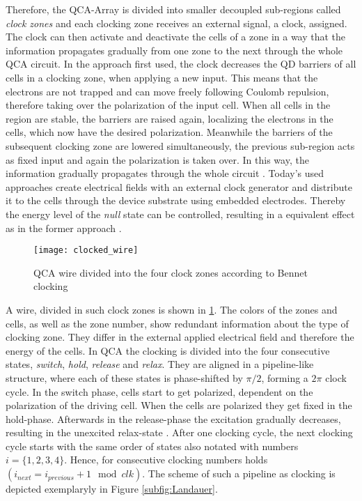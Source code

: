 Therefore, the QCA-Array is divided into smaller decoupled sub-regions called \textit{clock zones} and each clocking zone receives an external signal, a clock, assigned. The clock can then activate and deactivate the cells of a zone in a way that the information propagates gradually from one zone to the next through the whole QCA circuit. In the approach first used, the clock decreases the QD barriers of all cells in a clocking zone, when applying a new input. This means that the electrons are not trapped and can move freely following Coulomb repulsion, therefore taking over the polarization of the input cell. When all cells in the region are stable, the barriers are raised again, localizing the electrons in the cells, which now have the desired polarization. Meanwhile the barriers of the subsequent clocking zone are lowered simultaneously, the previous sub-region acts as fixed input and again the polarization is taken over. In this way, the information gradually propagates through the whole circuit \cite{lent1997device}. Today's used approaches create electrical fields with an external clock generator and distribute it to the cells through the device substrate using embedded electrodes. Thereby the energy level of the \textit{null} state can be controlled, resulting in a equivalent effect as in the former approach \cite{Walter}.\\
\begin{figure}
	\centering
	\texttt{[image: clocked\_wire]}
	\caption{QCA wire divided into the four clock zones according to Bennet clocking}\label{fig:QCA_wire_clocked}
\end{figure}
A wire, divided in such clock zones is shown in \ref{fig:QCA_wire_clocked}. The colors of the zones and cells, as well as the zone number, show redundant information about the type of clocking zone. They differ in the external applied electrical field and therefore the energy of the cells. In QCA the clocking is divided into the four consecutive states, \textit{switch}, \textit{hold}, \textit{release} and \textit{relax}. They are aligned in a pipeline-like structure, where each of these states is phase-shifted by $\pi/2$, forming a $2\pi$ clock cycle. In the switch phase, cells start to get polarized, dependent on the polarization of the driving cell. When the cells are polarized they get fixed in the hold-phase. Afterwards in the release-phase the excitation gradually decreases, resulting in the unexcited relax-state \cite{Sasamal2020QuantumDotCA}. After one clocking cycle, the next clocking cycle starts with the same order of states also notated with numbers $i = \{1, 2, 3, 4\}$. Hence, for consecutive clocking numbers holds $(i_{next} = i_{previous}+1 \mod clk)$. The scheme of such a pipeline as clocking is depicted exemplaryly in Figure \ref{subfig:Landauer}.

